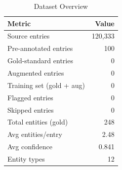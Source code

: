 \begin{table}[h]
\centering
\caption{Dataset Overview}
\label{tab:dataset-overview}
\begin{tabular}{lr}
\toprule
\textbf{Metric} & \textbf{Value} \\
\midrule
Source entries & 120,333 \\
Pre-annotated entries & 100 \\
Gold-standard entries & 0 \\
Augmented entries & 0 \\
Training set (gold + aug) & 0 \\
Flagged entries & 0 \\
Skipped entries & 0 \\
\midrule
Total entities (gold) & 248 \\
Avg entities/entry & 2.48 \\
Avg confidence & 0.841 \\
Entity types & 12 \\
\bottomrule
\end{tabular}
\end{table}